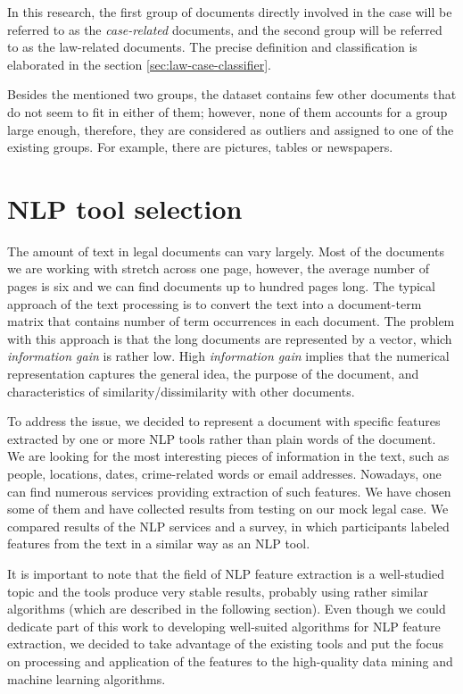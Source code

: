 \documentclass[
  digital, %
  notable,   %
  nolof,     %
  nolot,     %
]{fithesis3}
\begin{document}
In this research, the first group of documents directly involved in the case will be referred to as the \textit{case-related} documents, and the second group will be referred to as the law-related documents.
The precise definition and classification is elaborated in the section \ref{sec:law-case-classifier}.

Besides the mentioned two groups, the dataset contains few other documents that do not seem to fit in either of them; however, none of them accounts for a group large enough, therefore, they are considered as outliers and assigned to one of the existing groups.
For example, there are pictures, tables or newspapers.

\chapter{NLP tool selection}
\label{chp:nlp}
The amount of text in legal documents can vary largely.
Most of the documents we are working with stretch across one page, however, the average number of pages is six and we can find documents up to hundred pages long.
The typical approach of the text processing is to convert the text into a document-term matrix that contains number of term occurrences in each document.
The problem with this approach is that the long documents are represented by a vector, which \emph{information gain} is rather low.
High \emph{information gain} implies that the numerical representation captures the general idea, the purpose of the document, and characteristics of similarity/dissimilarity with other documents.

To address the issue, we decided to represent a document with specific features extracted by one or more NLP tools rather than plain words of the document.
We are looking for the most interesting pieces of information in the text, such as people, locations, dates, crime-related words or email addresses.
Nowadays, one can find numerous services providing extraction of such features.
We have chosen some of them and have collected results from testing on our mock legal case.
We compared results of the NLP services and a survey, in which participants labeled features from the text in a similar way as an NLP tool.

It is important to note that the field of NLP feature extraction is a well-studied topic and the tools produce very stable results, probably using rather similar algorithms (which are described in the following section). Even though we could dedicate part of this work to developing well-suited algorithms for NLP feature extraction, we decided to take advantage of the existing tools and put the focus on processing and application of the features to the high-quality data mining and machine learning algorithms. 
\end{document}
